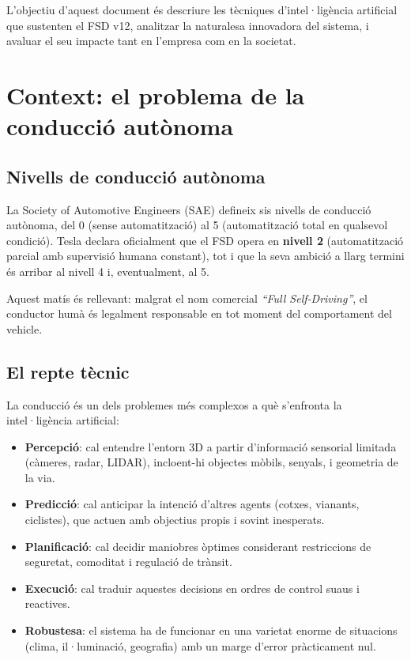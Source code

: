 \documentclass[11pt,a4paper]{article}
\begin{document}
L'objectiu d'aquest document és descriure les tècniques d'intel·ligència artificial que sustenten el FSD v12, analitzar la naturalesa innovadora del sistema, i avaluar el seu impacte tant en l'empresa com en la societat.

\section{Context: el problema de la conducció autònoma}

\subsection{Nivells de conducció autònoma}

La Society of Automotive Engineers (SAE) defineix sis nivells de conducció autònoma, del 0 (sense automatització) al 5 (automatització total en qualsevol condició). Tesla declara oficialment que el FSD opera en \textbf{nivell 2} (automatització parcial amb supervisió humana constant), tot i que la seva ambició a llarg termini és arribar al nivell 4 i, eventualment, al 5.

Aquest matís és rellevant: malgrat el nom comercial \emph{``Full Self-Driving''}, el conductor humà és legalment responsable en tot moment del comportament del vehicle.

\subsection{El repte tècnic}

La conducció és un dels problemes més complexos a què s'enfronta la intel·ligència artificial:

\begin{itemize}[leftmargin=*]
    \item \textbf{Percepció}: cal entendre l'entorn 3D a partir d'informació sensorial limitada (càmeres, radar, LIDAR), incloent-hi objectes mòbils, senyals, i geometria de la via.
    \item \textbf{Predicció}: cal anticipar la intenció d'altres agents (cotxes, vianants, ciclistes), que actuen amb objectius propis i sovint inesperats.
    \item \textbf{Planificació}: cal decidir maniobres òptimes considerant restriccions de seguretat, comoditat i regulació de trànsit.
    \item \textbf{Execució}: cal traduir aquestes decisions en ordres de control suaus i reactives.
    \item \textbf{Robustesa}: el sistema ha de funcionar en una varietat enorme de situacions (clima, il·luminació, geografia) amb un marge d'error pràcticament nul.
\end{itemize}
\end{document}
